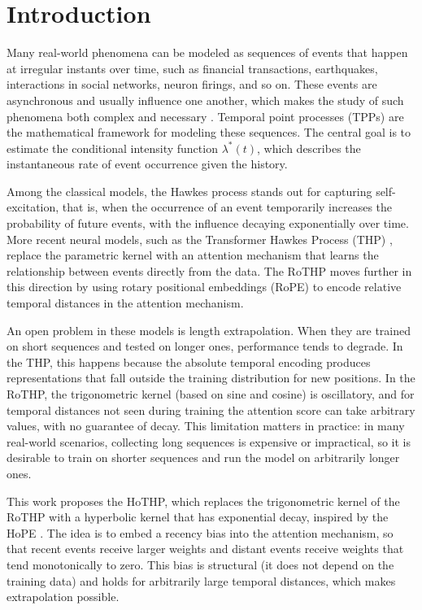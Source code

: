 \chapter{Introduction}
\label{cap:introducao}

Many real-world phenomena can be modeled as sequences of events that happen at irregular instants over time, such as financial transactions, earthquakes, interactions in social networks, neuron firings, and so on. These events are asynchronous and usually influence one another, which makes the study of such phenomena both complex and necessary \cite{zhou_advances_2025}. Temporal point processes (TPPs) are the mathematical framework for modeling these sequences. The central goal is to estimate the conditional intensity function $\lambda^*(t)$, which describes the instantaneous rate of event occurrence given the history.

Among the classical models, the Hawkes process \cite{hawkes_spectra_1971} stands out for capturing self-excitation, that is, when the occurrence of an event temporarily increases the probability of future events, with the influence decaying exponentially over time. More recent neural models, such as the Transformer Hawkes Process (\gls{THP}) \cite{zuo_transformer_2021}, replace the parametric kernel with an attention mechanism that learns the relationship between events directly from the data. The \gls{RoTHP} \cite{dai_rotary_2026} moves further in this direction by using rotary positional embeddings (RoPE) \cite{su_roformer_2023} to encode relative temporal distances in the attention mechanism.

An open problem in these models is length extrapolation. When they are trained on short sequences and tested on longer ones, performance tends to degrade. In the THP, this happens because the absolute temporal encoding produces representations that fall outside the training distribution for new positions. In the RoTHP, the trigonometric kernel (based on sine and cosine) is oscillatory, and for temporal distances not seen during training the attention score can take arbitrary values, with no guarantee of decay. This limitation matters in practice: in many real-world scenarios, collecting long sequences is expensive or impractical, so it is desirable to train on shorter sequences and run the model on arbitrarily longer ones.

This work proposes the \gls{HoTHP}, which replaces the trigonometric kernel of the RoTHP with a hyperbolic kernel that has exponential decay, inspired by the \gls{HoPE} \cite{dai_hope_2025}. The idea is to embed a recency bias into the attention mechanism, so that recent events receive larger weights and distant events receive weights that tend monotonically to zero. This bias is structural (it does not depend on the training data) and holds for arbitrarily large temporal distances, which makes extrapolation possible.

